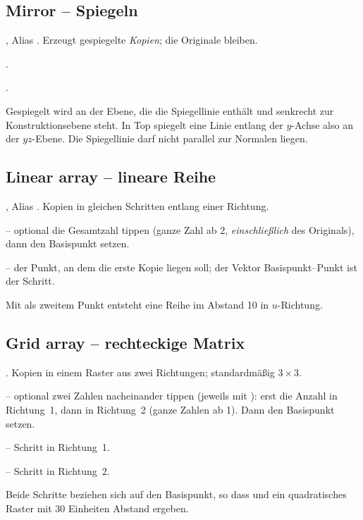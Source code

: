\subsection{Mirror -- Spiegeln}\label{sec:cmd-mirror}
, Alias . Erzeugt gespiegelte \emph{Kopien}; die Originale bleiben.
\begin{schritte}
\item {}.
\item {}.
\end{schritte}
Gespiegelt wird an der Ebene, die die Spiegellinie enthält und senkrecht zur
Konstruktionsebene steht. In Top spiegelt eine Linie entlang der $y$-Achse also an der
$yz$-Ebene. Die Spiegellinie darf nicht parallel zur Normalen liegen.

\subsection{Linear array -- lineare Reihe}\label{sec:cmd-array-linear}
, Alias . Kopien in gleichen Schritten entlang einer Richtung.
\begin{schritte}
\item {} --
  optional die Gesamtzahl tippen (ganze Zahl ab 2, \emph{einschließlich} des Originals), dann
  den Basispunkt setzen.
\item {} -- der Punkt, an dem die erste
  Kopie liegen soll; der Vektor Basispunkt--Punkt ist der Schritt.
\end{schritte}
Mit  als zweitem Punkt entsteht eine Reihe im Abstand 10 in $u$-Richtung.

\subsection{Grid array -- rechteckige Matrix}\label{sec:cmd-array-grid}
. Kopien in einem Raster aus zwei Richtungen; standardmäßig $3 \times 3$.
\begin{schritte}
\item {} --
  optional zwei Zahlen nacheinander tippen (jeweils mit ): erst die Anzahl in
  Richtung~1, dann in Richtung~2 (ganze Zahlen ab 1). Dann den Basispunkt setzen.
\item {} -- Schritt in Richtung~1.
\item {} -- Schritt in
  Richtung~2.
\end{schritte}
Beide Schritte beziehen sich auf den Basispunkt, so dass  und  ein
quadratisches Raster mit 30 Einheiten Abstand ergeben.

